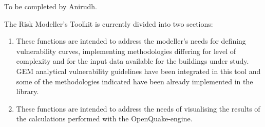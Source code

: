 To be completed by Anirudh.

The Risk Modeller's Toolkit is currently divided into two sections:
\begin{enumerate}
\item These functions are intended to address the modeller's needs for defining vulnerability curves, implementing methodologies differing for level of complexity and for the input data available for the buildings under study. GEM analytical vulnerability guidelines have been integrated in this tool and some of the methodologies indicated have been already implemented in the library.
\item These functions are intended to address the needs of visualising the results of the calculations performed with the OpenQuake-engine.
\end{enumerate}
